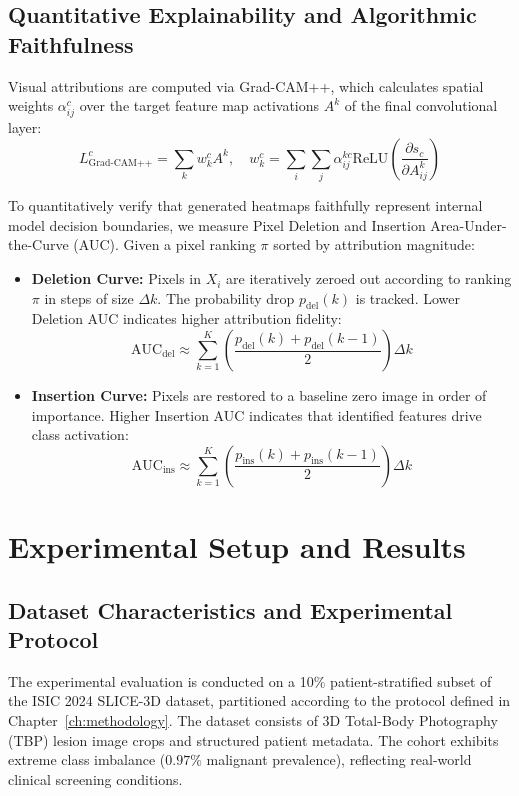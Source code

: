 \documentclass[12pt,a4paper]{report}
\begin{document}
	\section{Quantitative Explainability and Algorithmic Faithfulness}
	Visual attributions are computed via Grad-CAM++, which calculates spatial weights $\alpha_{ij}^c$ over the target feature map activations $A^k$ of the final convolutional layer:
	\begin{equation}
		L_{\text{Grad-CAM++}}^c = \sum_k w_k^c A^k, \quad w_k^c = \sum_i \sum_j \alpha_{ij}^{kc} \text{ReLU}\left( \frac{\partial s_c}{\partial A_{ij}^k} \right)
	\end{equation}
	
	To quantitatively verify that generated heatmaps faithfully represent internal model decision boundaries, we measure Pixel Deletion and Insertion Area-Under-the-Curve (AUC). Given a pixel ranking $\pi$ sorted by attribution magnitude:
	\begin{itemize}
		\item \textbf{Deletion Curve:} Pixels in $X_i$ are iteratively zeroed out according to ranking $\pi$ in steps of size $\Delta k$. The probability drop $p_{\text{del}}(k)$ is tracked. Lower Deletion AUC indicates higher attribution fidelity:
		\begin{equation}
			\text{AUC}_{\text{del}} \approx \sum_{k=1}^K \left( \frac{p_{\text{del}}(k) + p_{\text{del}}(k-1)}{2} \right) \Delta k
		\end{equation}
		\item \textbf{Insertion Curve:} Pixels are restored to a baseline zero image in order of importance. Higher Insertion AUC indicates that identified features drive class activation:
		\begin{equation}
			\text{AUC}_{\text{ins}} \approx \sum_{k=1}^K \left( \frac{p_{\text{ins}}(k) + p_{\text{ins}}(k-1)}{2} \right) \Delta k
		\end{equation}
	\end{itemize}
	
	\chapter{Experimental Setup and Results}
	\label{ch:experiments}
	
	\section{Dataset Characteristics and Experimental Protocol}
	The experimental evaluation is conducted on a 10\% patient-stratified subset of the ISIC 2024 SLICE-3D dataset, partitioned according to the protocol defined in Chapter~\ref{ch:methodology}. The dataset consists of 3D Total-Body Photography (TBP) lesion image crops and structured patient metadata. The cohort exhibits extreme class imbalance ($0.97\%$ malignant prevalence), reflecting real-world clinical screening conditions.
	
\end{document}
